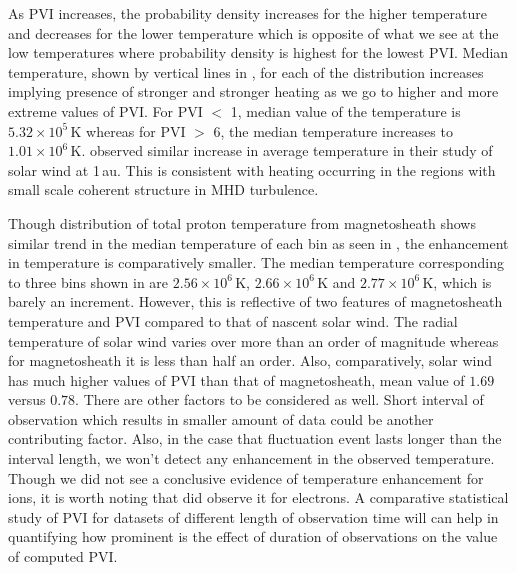         As PVI increases, the probability density increases for the higher temperature and decreases
        for the lower temperature which is opposite of what we see at the low temperatures where
        probability density is highest for the lowest PVI. Median temperature, shown by vertical
        lines in , for each of the distribution increases implying presence of
        stronger and stronger heating as we go to higher and more extreme values of PVI. For PVI $<$
        1, median value of the temperature is $5.32 \times 10^5$\,K whereas for PVI $>$ 6, the
        median temperature increases to $1.01 \times 10^6$\,K. \citet{Osman2011} observed similar
        increase in average temperature in their study of solar wind at 1\,au. This is consistent
        with heating occurring in the regions with small scale coherent structure in MHD turbulence.

        Though distribution of total proton temperature from magnetosheath shows similar trend in
        the median temperature of each bin as seen in , the enhancement in
        temperature is comparatively smaller. The median temperature corresponding to three bins
        shown in  are $2.56 \times 10^6$\,K, $2.66 \times 10^6$\,K and $2.77
        \times 10^6$\,K, which is barely an increment. However, this is reflective of two features
        of magnetosheath temperature and PVI compared to that of nascent solar wind. The radial
        temperature of solar wind varies over more than an order of magnitude whereas for
        magnetosheath it is less than half an order. Also, comparatively, solar wind has much higher
        values of PVI than that of magnetosheath, mean value of $1.69$ versus $0.78$. There are
        other factors to be considered as well. Short interval of observation which results in
        smaller amount of data could be another contributing factor. Also, in the case that
        fluctuation event lasts longer than the interval length, we won't detect any enhancement in
        the observed temperature. Though we did not see a conclusive evidence of temperature
        enhancement for ions, it is worth noting that \citet{Chasapis2018} did observe it for
        electrons. A comparative statistical study of PVI for datasets of different length of
        observation time will can help in quantifying how prominent is the effect of duration of
        observations on the value of computed PVI.

